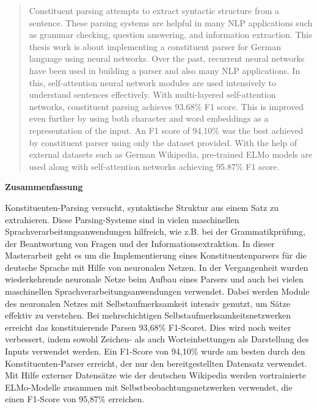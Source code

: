 \documentclass[a4paper, 11pt]{article}
\begin{document}
\begin{abstract}

Constituent parsing attempts to extract syntactic structure from a sentence. These parsing systems are helpful in many NLP applications such as grammar checking, question answering, and information extraction. This thesis work is about implementing a constituent parser for German language using neural networks. Over the past, recurrent neural networks have been used in building a parser and also many NLP applications. In this, self-attention neural network modules are used intensively to understand sentences effectively. With multi-layered self-attention networks, constituent parsing achieves 93.68\% F1 score. This is improved even further by using both character and word embeddings as a representation of the input. An F1 score of 94.10\% was the best achieved by constituent parser using only the dataset provided. With the help of external datasets such as German Wikipedia, pre-trained ELMo models are used along with self-attention networks achieving 95.87\% F1 score.
\end{abstract}
\vspace*{5em}  
\begin{center}
\textbf{Zusammenfassung} \\
\end{center}
Konstituenten-Parsing versucht, syntaktische Struktur aus einem Satz zu extrahieren. Diese Parsing-Systeme sind in vielen maschinellen Sprachverarbeitungsanwendungen hilfreich, wie z.B. bei der Grammatikprüfung, der Beantwortung von Fragen und der Informationsextraktion. In dieser Masterarbeit geht es um die Implementierung eines Konstituentenparsers für die deutsche Sprache mit Hilfe von neuronalen Netzen. In der Vergangenheit wurden wiederkehrende neuronale Netze beim Aufbau eines Parsers und auch bei vielen maschinellen Sprachverarbeitungsanwendungen verwendet. Dabei werden Module des neuronalen Netzes mit Selbstaufmerksamkeit intensiv genutzt, um Sätze effektiv zu verstehen. Bei mehrschichtigen Selbstaufmerksamkeitsnetzwerken erreicht das konstituierende Parsen 93,68\% F1-Scoret. Dies wird noch weiter verbessert, indem sowohl Zeichen- als auch Worteinbettungen als Darstellung des Inputs verwendet werden. Ein F1-Score von 94,10\% wurde am besten durch den Konstituenten-Parser erreicht, der nur den bereitgestellten Datensatz verwendet. Mit Hilfe externer Datensätze wie der deutschen Wikipedia werden vortrainierte ELMo-Modelle zusammen mit Selbstbeobachtungsnetzwerken verwendet, die einen F1-Score von 95,87\% erreichen.
\pagebreak
\end{document}
